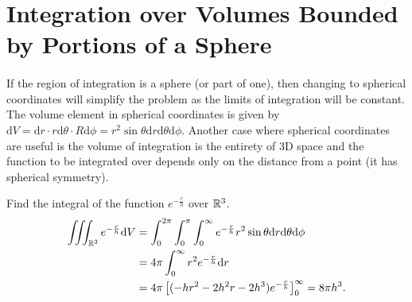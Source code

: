 \documentclass[../multivariate_calculus.tex]{subfiles}
\begin{document}
    \section{Integration over Volumes Bounded by Portions of a Sphere}
        \paragraph{}
        If the region of integration is a sphere (or part of one), then changing to spherical coordinates will simplify the problem as the limits of integration will be constant.
        The volume element in spherical coordinates is given by $\mathrm{d}V=\mathrm{d}r\cdot r\mathrm{d}\theta\cdot R\mathrm{d}\phi=r^2\sin\theta\mathrm{d}r\mathrm{d}\theta\mathrm{d}\phi$.
        Another case where spherical coordinates are useful is the volume of integration is the entirety of 3D space and the function to be integrated over depends only on the distance from a point (it has spherical symmetry).
        \begin{example}
            Find the integral of the function $e^{-\frac{r}{h}}$ over $\mathbb{R}^3$.
            \begin{align}
                \iiint_{\mathbb{R}^3}e^{-\frac{r}{h}}\mathrm{d}V&=\int_0^{2\pi}\int_0^\pi\int_0^\infty e^{-\frac{r}{h}}r^2\sin\theta\mathrm{d}r\mathrm{d}\theta\mathrm{d}\phi\\
                &=4\pi\int_0^\infty r^2e^{-\frac{r}{h}}\mathrm{d}r\\
                &=4\pi\left[(-hr^2-2h^2r-2h^3)e^{-\frac{r}{h}}\right]_0^\infty=8\pi h^3.
            \end{align}
        \end{example}
\end{document}
